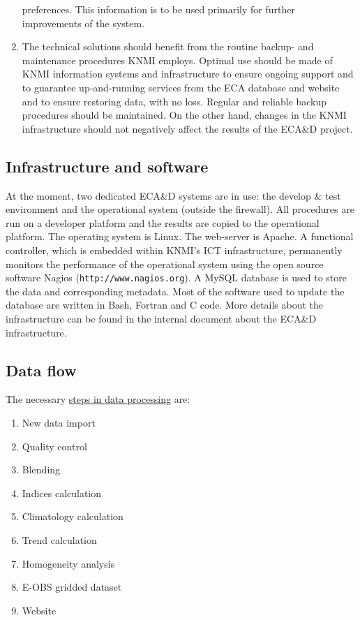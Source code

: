 \documentclass[a4paper,11pt]{article}
\begin{document}
\begin{enumerate}
      preferences. This information is to be used primarily for
      further improvements of the system.
\item The technical solutions should benefit from the routine backup-
      and maintenance procedures KNMI employs. Optimal use should be
      made of KNMI information systems and infrastructure to ensure
      ongoing support and to guarantee up-and-running services from
      the ECA data\-base and website and to ensure restoring data, with
      no loss. Regular and reliable backup procedures should be
      maintained. On the other hand, changes in the KNMI
      infrastructure should not negatively affect the results of the
      ECA\&D project.
\end{enumerate}

\subsection{Infrastructure and software}
\label{sec:infra}

At the moment, two dedicated ECA\&D systems are in use: the develop \&
test environment and the operational system (outside the
firewall). All procedures are run on a developer platform and the
results are copied to the operational platform. The operating system
is Linux. The web-server is Apache. A functional controller, which is
embedded within KNMI's ICT infrastructure, permanently monitors the
performance of the operational system using the open source
software Nagios ({\tt http://www.nagios.org}). A MySQL
database is used to store the data and corresponding metadata. Most of
the software used to update the database are written in Bash, Fortran
and C code. More details about the infrastructure can be found in the
internal document about the ECA\&D infrastructure.


\subsection{Data flow}
\label{sec:flow}

The necessary \underline{steps in data processing} are:
\begin{enumerate}
\item New data import
\item Quality control
\item Blending
\item Indices calculation
\item Climatology calculation
\item Trend calculation
\item Homogeneity analysis
\item E-OBS gridded dataset
\item Website
\end{enumerate}
\end{document}
